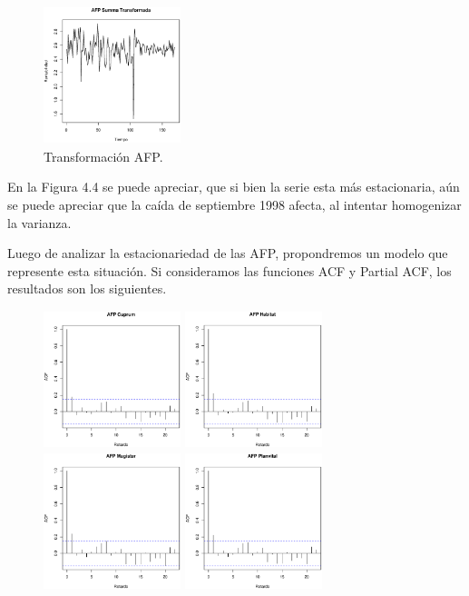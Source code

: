 \begin{figure}[!ht]
\begin{center}
  \includegraphics[height=4cm, width=4cm]{afptr7.eps}
   \caption{Transformaci\'on AFP.}
\label{caja}
\end{center}
\end{figure}

En la Figura 4.4 se puede apreciar, que si bien la serie esta m\'as estacionaria, a\'un se puede apreciar que la ca\'ida de septiembre 1998 afecta, al intentar homogenizar la varianza.

Luego de analizar la estacionariedad de las AFP, propondremos un modelo que represente esta situaci\'on. Si consideramos las funciones ACF  y Partial ACF, los resultados son los siguientes.

\begin{figure}[!ht]
\centering
  \includegraphics[height=4cm, width=4cm]{acf1.eps}
  \includegraphics[height=4cm, width=4cm]{acf2.eps}
  \includegraphics[height=4cm, width=4cm]{acf3.eps}
  \includegraphics[height=4cm, width=4cm]{acf4.eps}
\label{caja}
\end{figure}

